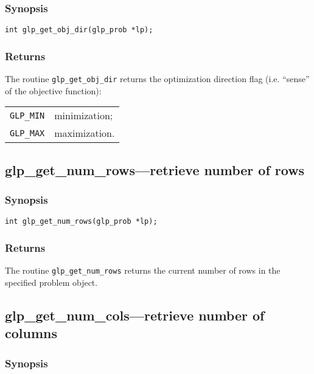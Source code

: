 \subsubsection*{Synopsis}

\begin{verbatim}
int glp_get_obj_dir(glp_prob *lp);
\end{verbatim}

\subsubsection*{Returns}

The routine \verb|glp_get_obj_dir| returns the optimization direction
flag (i.e. ``sense'' of the objective function):

\begin{tabular}{@{}ll}
\verb|GLP_MIN| & minimization; \\
\verb|GLP_MAX| & maximization. \\
\end{tabular}

\pagebreak

\subsection{glp\_get\_num\_rows---retrieve number of rows}

\subsubsection*{Synopsis}

\begin{verbatim}
int glp_get_num_rows(glp_prob *lp);
\end{verbatim}

\subsubsection*{Returns}

The routine \verb|glp_get_num_rows| returns the current number of rows
in the specified problem object.

\subsection{glp\_get\_num\_cols---retrieve number of columns}

\subsubsection*{Synopsis}


